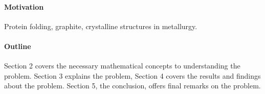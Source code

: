 \paragraph{Motivation}
Protein folding, graphite, crystalline structures in metallurgy.
\paragraph{Outline}
Section 2 covers the necessary mathematical concepts to understanding the
problem.  Section 3 explains the problem, Section 4 covers the results and
findings about the problem.  Section 5, the conclusion, offers final remarks on
the problem.
